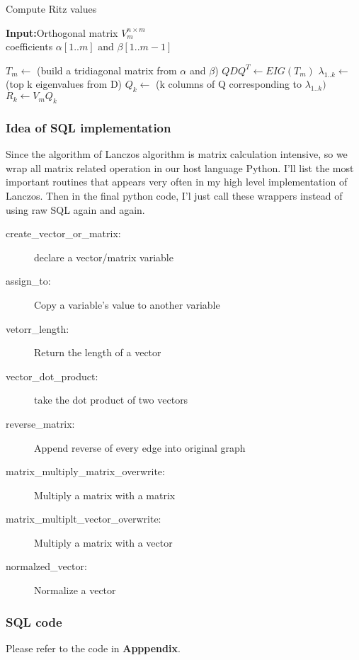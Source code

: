 \begin{algorithm}
\caption{Compute Ritz values}
{\bf Input:}Orthogonal matrix $V^{n\times m}_{m}$\\
coefficients $\alpha[1..m]$ and $\beta[1..m-1]$
\begin{algorithmic}[1]
\STATE $T_{m} \leftarrow$ (build a tridiagonal matrix from $\alpha$ and $\beta$)
\STATE $QDQ^{T} \leftarrow EIG(T_{m})$
\STATE $\lambda_{1..k} \leftarrow$ (top k eigenvalues from D)
\STATE $Q_{k} \leftarrow $ (k columns of Q corresponding to $\lambda_{1..k})$
\STATE $R_{k} \leftarrow V_{m}Q_{k}$
\end{algorithmic}
\label{eigen:algo3}
\end{algorithm}

\subsubsection{Idea of SQL implementation}
Since the algorithm of Lanczos algorithm is matrix calculation intensive, so we wrap all matrix related operation in our host language Python. I'll list the most important routines that appears very often in my high level implementation of Lanczos. Then in the final python code, I'l just call these wrappers instead of using raw SQL again and again.
\begin{description}
  \item[create\_vector\_or\_matrix:]{declare a vector/matrix variable}
  \item[assign\_to:]{Copy a variable's value to another variable}
  \item[vetorr\_length:]{Return the length of a vector}
  \item[vector\_dot\_product:]{take the dot product of two vectors}
  \item[reverse\_matrix:]{Append reverse of every edge into original graph}
  \item[matrix\_multiply\_matrix\_overwrite:]{Multiply a matrix with a matrix}
  \item[matrix\_multiplt\_vector\_overwrite:]{Multiply a matrix with a vector}
  \item[normalzed\_vector:]{Normalize a vector}
\end{description}

\subsubsection{SQL code}
Please refer to the code in {\bf Apppendix}.

